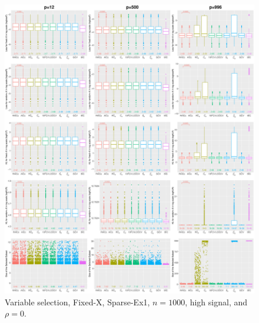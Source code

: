 \begin{figure}[!ht]
\centering
\includegraphics[width=\textwidth]{figures/supplement/fixedx/subset_selection/Sparse-Ex1_n1000_hsnr_rho0.eps}
\caption{Variable selection, Fixed-X, Sparse-Ex1, $n=1000$, high signal, and $\rho=0$.}
\end{figure}
\clearpage
